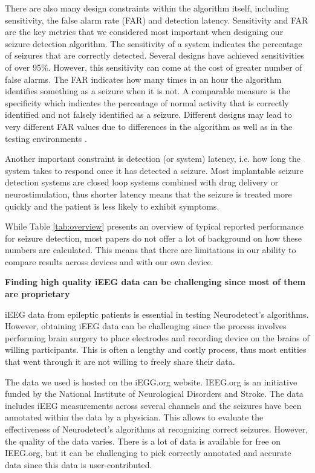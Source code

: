 \documentclass[usletter, 11pt]{extarticle}
\begin{document}
There are also many design constraints within the algorithm itself, including sensitivity, the false alarm rate (FAR) and detection latency. Sensitivity and FAR are the key metrics that we considered most important when designing our seizure detection algorithm. The sensitivity of a system indicates the percentage of seizures that are correctly detected. Several designs have achieved sensitivities of over 95\%. However, this sensitivity can come at the cost of greater number of false alarms. The FAR indicates how many times in an hour the algorithm identifies something as a seizure when it is not. A comparable measure is the specificity which indicates the percentage of normal activity that is correctly identified and not falsely identified as a seizure. Different designs may lead to very different FAR values due to differences in the algorithm as well as in the testing environments \cite{shoaran2016}.

Another important constraint is detection (or system) latency, i.e. how long the system takes to respond once it has detected a seizure. Most implantable seizure detection systems are closed loop systems combined with drug delivery or neurostimulation, thus shorter latency means that the seizure is treated more quickly and the patient is less likely to exhibit symptoms.

While Table \ref{tab:overview} presents an overview of typical reported performance for seizure detection, most papers do not offer a lot of background on how these numbers are calculated. This means that there are limitations in our ability to compare results across devices and with our own device. 

\vspace{11pt}
\textbf{Finding high quality iEEG data can be challenging since most of them are proprietary}

iEEG data from epileptic patients is essential in testing Neurodetect's algorithms. However, obtaining iEEG data can be challenging since the process involves performing brain surgery to place electrodes and recording device on the brains of willing participants. This is often a lengthy and costly process, thus most entities that went through it are not willing to freely share their data.

The data we used is hosted on the iEGG.org \cite{ieegorg} website.
IEEG.org is an initiative funded by the National Institute of Neurological Disorders and Stroke. The data includes iEEG measurements across several channels and the seizures have been annotated within the data by a physician. This allows to evaluate the effectiveness of Neurodetect's algorithms at recognizing correct seizures. However, the quality of the data varies. There is a lot of data is available for free on IEEG.org, but it can be challenging to pick correctly annotated and accurate data since this data is user-contributed.
\end{document}
